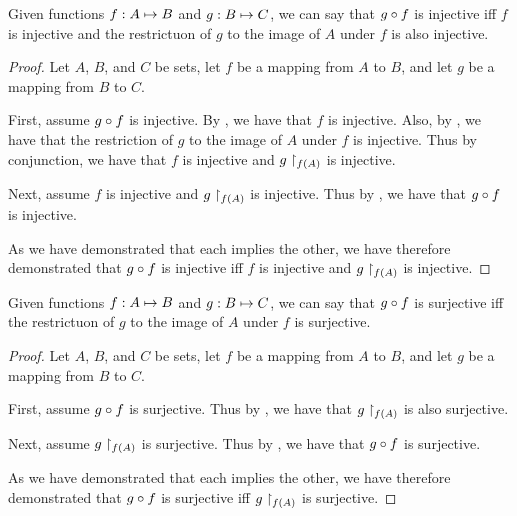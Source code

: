\documentclass[main.tex]{subfiles}
\begin{document}
\begin{thm}
	Given functions \({f}: {A} \mapsto{} {B}\) and \({g}: {B} \mapsto{} {C}\), we can
	say that \({g} \circ{} {f}\) is injective iff \(f\) is injective and the
	restrictuon of \(g\) to the image of \(A\) under \(f\) is also
	injective.
\end{thm}
\begin{proof}
	Let \(A\), \(B\), and \(C\) be sets, let \(f\) be a mapping from \(A\)
	to \(B\), and let \(g\) be a mapping from \(B\) to \(C\).

	First, assume \({g} \circ{} {f}\) is injective. By , we
	have that \(f\) is injective. Also, by , we have that
	the restriction of \(g\) to the image of \(A\) under \(f\) is injective.
	Thus by conjunction, we have that \(f\) is injective and
	\({g}\restriction_{f(A)}\) is injective.

	Next, assume \(f\) is injective and \({g}\restriction_{f(A)}\) is injective.
	Thus by , we have that \({g} \circ{} {f}\) is injective.

	As we have demonstrated that each implies the other, we have therefore
	demonstrated that \({g} \circ{} {f}\) is injective iff \(f\) is injective
	and \({g}\restriction_{f(A)}\) is injective.
\end{proof}

\begin{thm}
	Given functions \({f}: {A} \mapsto{} {B}\) and \({g}: {B} \mapsto{} {C}\), we can
	say that \({g} \circ{} {f}\) is surjective iff the restrictuon of \(g\)
	to the image of \(A\) under \(f\) is surjective.
\end{thm}
\begin{proof}
	Let \(A\), \(B\), and \(C\) be sets, let \(f\) be a mapping from \(A\)
	to \(B\), and let \(g\) be a mapping from \(B\) to \(C\).

	First, assume \({g} \circ{} {f}\) is surjective. Thus by ,
	we have that \({g}\restriction_{f(A)}\) is also surjective.

	Next, assume \({g}\restriction_{f(A)}\) is surjective. Thus by
	, we have that \({g} \circ{} {f}\) is surjective.

	As we have demonstrated that each implies the other, we have therefore
	demonstrated that \({g} \circ{} {f}\) is surjective iff
	\({g}\restriction_{f(A)}\) is surjective.
\end{proof}
\end{document}
